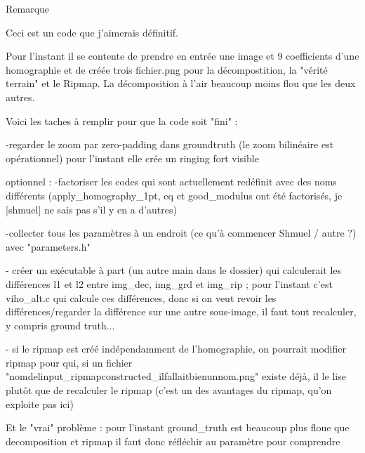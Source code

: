 Remarque

Ceci est un code que j’aimerais définitif.

Pour l'instant il se contente de prendre en entrée une image et 9 coefficients d'une homographie et de créée trois fichier.png pour la décompostition, la "vérité terrain" et le Ripmap.
La décomposition à l'air beaucoup moins flou que les deux autres.



Voici les taches à remplir pour que la code soit "fini" :

	-regarder le zoom par zero-padding dans groundtruth (le zoom bilinéaire est opérationnel)
		pour l'instant elle crée un ringing fort visible
	
	
	
optionnel :
	-factoriser les codes qui sont actuellement redéfinit avec des noms différents (apply_homography_1pt, eq et good_modulus ont été factorisés, je [shmuel] ne sais pas s'il y en a d'autres) 
	
	-collecter tous les paramètres à un endroit (ce qu'à commencer Shmuel / autre ?) avec "parameters.h"
	
	- créer un exécutable à part (un autre main dans le dossier) qui calculerait les différences l1 et l2 entre img_dec, img_grd et img_rip ; pour l'instant c'est viho_alt.c qui calcule ces différences, donc si on veut revoir les différences/regarder la différence sur une autre sous-image, il faut tout recalculer, y compris ground truth...
	
	- si le ripmap est créé indépendamment de l'homographie, on pourrait modifier ripmap pour qui, si un fichier "nomdelinput_ripmapconstructed_ilfallaitbienunnom.png" existe déjà, il le lise plutôt que de recalculer le ripmap (c'est un des avantages du ripmap, qu'on exploite pas ici)
	
	
	
Et le "vrai" problème :
	pour l'instant ground_truth est beaucoup plus floue que decomposition et ripmap
	il faut donc réfléchir au paramètre pour comprendre
